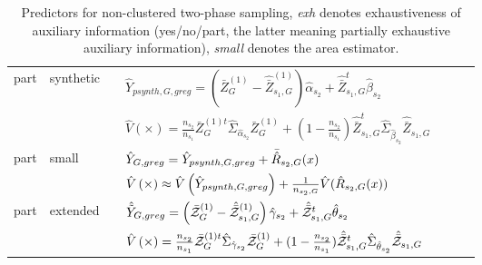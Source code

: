 \begin{table}
\begin{tabular}{l l l l l r l}
\strongrule
			
     part 	&  synthetic 	& \cite[eq. 34]{Man13b} & $\hat{Y}_{psynth,G,greg} = \left( \bar{Z}_G^{(1)}- \hat{\bar{Z}}_{s_1,G}^{(1)}\right) \hat{\alpha}_{s_2} + \hat{\bar{Z}}^t_{s_1,G}\hat{\beta}_{s_2}$\\
        &    	&     \cite[eq. 35]{Man13b} & $\hat{V}\left(\times\right) = \frac{n_{s_2}}{n_{s_1}}\bar{Z}^{(1)t}_G \hat{\Sigma}_{ \hat{\alpha}_{s_2}} \bar{Z}^{(1)}_G + (1-\frac{n_{s_2}}{n_{s_1}})\hat{\bar{Z}}^{t}_{s_1,G} \hat{\Sigma}_{ \hat{\beta}_{s_2}} \hat{\bar{Z}}_{s_1,G} $ \\
\lightrule
			
     part 	&  small 	& \cite[eq. 24]{Man13b} & $\hat{Y}_{G,greg} = \hat{Y}_{psynth,G,greg} + \bar{\hat{R}}_{s_2,G}(x)$\\
            &      	& \cite[eq. 23]{Man13b} & $\hat{V}\left(\times\right) \approx \hat{V}\left(\hat{Y}_{psynth,G,greg}\right) + \frac{1}{n_{s_2,G}}\hat{V}(\hat{R}_{s_2,G}(x))$\\
\lightrule

     part 	&  extended 	& \cite[eq. 30]{Man13b} & $\hat{\tilde{Y}}_{G,greg} = \left( \bar{\mathcal{Z}}_G^{(1)}- \hat{\bar{\mathcal{Z}}}_{s_1,G}^{(1)}\right) \hat{\gamma}_{s_2} + \hat{\bar{\mathcal{Z}}}^t_{s_1,G}\hat{\theta}_{s_2}$\\
        &    	&     \cite[eq. 31]{Man13b} & $\hat{V}\left(\times\right) = \frac{n_{s_2}}{n_{s_1}}\bar{\mathcal{Z}}^{(1)t}_G \hat{\Sigma}_{ \hat{\gamma}_{s_2}} \bar{\mathcal{Z}}^{(1)}_G + (1-\frac{n_{s_2}}{n_{s_1}})\hat{\bar{\mathcal{Z}}}^{t}_{s_1,G} \hat{\Sigma}_{ \hat{\theta}_{s_2}} \hat{\bar{\mathcal{Z}}}_{s_1,G} $\\
\end{tabular}
\caption{Predictors for non-clustered two-phase sampling, 
    \emph{exh} denotes exhaustiveness of auxiliary information (yes/no/part, the
    latter meaning partially exhaustive auxiliary information),
    \emph{small} denotes the area estimator. \label{tab:unclustered2}
}
\end{table}
